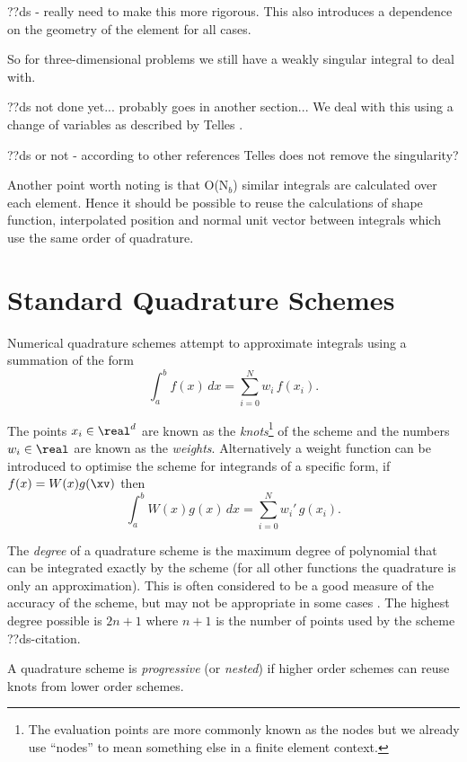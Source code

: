 ??ds - really need to make this more rigorous. This also introduces a dependence on the geometry of the element for all cases.

So for three-dimensional problems we still have a weakly singular integral to deal with.

??ds not done yet... probably goes in another section... We deal with this using a change of variables as described by Telles \cite{Telles1987}.

??ds or not - according to other references Telles does not remove the singularity?

Another point worth noting is that O(N$_b$) similar integrals are calculated over each element.
Hence it should be possible to reuse the calculations of shape function, interpolated position and normal unit vector between integrals which use the same order of quadrature.

\section{Standard Quadrature Schemes}

Numerical quadrature schemes attempt to approximate integrals using a summation of the form
\[ \int_a^b f(x) \, dx = \sum_{i=0}^N w_i \, f(x_i). \]

The points $x_i \in \real^d$ are known as the \emph{knots}\footnote{The evaluation points are more commonly known as the nodes but we already use ``nodes'' to mean something else in a finite element context.} of the scheme and the numbers $w_i \in \real$ are known as the \emph{weights}.
Alternatively a weight function can be introduced to optimise the scheme for integrands of a specific form, if $f(x) = W(x) g(\xv)$ then
\begin{equation}
  \label{eq:9}
  \int_a^b W(x) g(x) \, dx = \sum_{i=0}^N w_i' \, g(x_i).
\end{equation}

The \emph{degree} of a quadrature scheme is the maximum degree of polynomial that can be integrated exactly by the scheme (for all other functions the quadrature is only an approximation).
This is often considered to be a good measure of the accuracy of the scheme, but may not be appropriate in some cases \cite{Trefethen2008}.
The highest degree possible is $2n + 1$ where $n + 1$ is the number of points used by the scheme ??ds-citation.

A quadrature scheme is \emph{progressive} (or \emph{nested}) if higher order schemes can reuse knots from lower order schemes.

